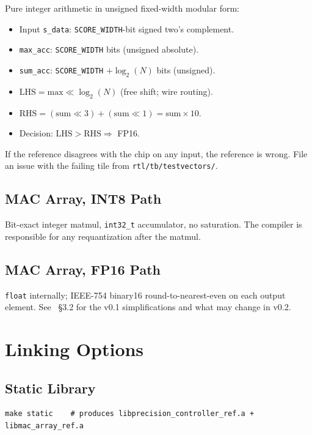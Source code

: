 \documentclass[11pt]{article}
\begin{document}
Pure integer arithmetic in unsigned fixed-width modular form:

\begin{itemize}
\item Input \texttt{s\_data}: \texttt{SCORE\_WIDTH}-bit signed
      two's complement.
\item \texttt{max\_acc}: \texttt{SCORE\_WIDTH} bits (unsigned absolute).
\item \texttt{sum\_acc}: \texttt{SCORE\_WIDTH} $+ \log_2(N)$ bits
      (unsigned).
\item $\text{LHS} = \text{max} \ll \log_2(N)$ (free shift; wire
      routing).
\item $\text{RHS} = (\text{sum} \ll 3) + (\text{sum} \ll 1) =
      \text{sum} \times 10$.
\item Decision: $\text{LHS} > \text{RHS} \Rightarrow$ FP16.
\end{itemize}

If the reference disagrees with the chip on any input, the reference
is wrong. File an issue with the failing tile from
\texttt{rtl/tb/testvectors/}.

\subsection{MAC Array, INT8 Path}

Bit-exact integer matmul, \texttt{int32\_t} accumulator, no
saturation. The compiler is responsible for any requantization after
the matmul.

\subsection{MAC Array, FP16 Path}

\texttt{float} internally; IEEE-754 binary16 round-to-nearest-even
on each output element. See ~\S3.2
for the v0.1 simplifications and what may change in v0.2.

\section{Linking Options}
\label{sec:linking}

\subsection{Static Library}
\begin{lstlisting}[basicstyle=\ttfamily\small]
make static    # produces libprecision_controller_ref.a + libmac_array_ref.a
\end{lstlisting}
\end{document}
